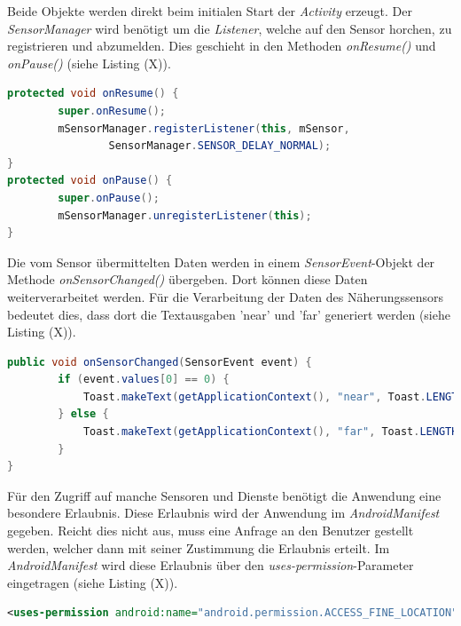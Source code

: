 Beide Objekte werden direkt beim initialen Start der \textit{Activity} erzeugt. Der \textit{SensorManager} wird benötigt um die \textit{Listener}, welche auf den Sensor horchen, zu registrieren und abzumelden. Dies geschieht in den Methoden \textit{onResume()} und \textit{onPause()} (siehe Listing (X)). 
\clearpage

\begin{lstlisting}[caption=Die Methoden \textit{onResume()} und \textit{onPause()}, label=lst:SensorInit, language=Java]
protected void onResume() {
        super.onResume();
        mSensorManager.registerListener(this, mSensor,
                SensorManager.SENSOR_DELAY_NORMAL);
}
protected void onPause() {
        super.onPause();
        mSensorManager.unregisterListener(this);
}
\end{lstlisting} 

Die vom Sensor übermittelten Daten werden in einem \textit{SensorEvent}-Objekt der Methode \textit{onSensorChanged()} übergeben. Dort können diese Daten weiterverarbeitet werden. Für die Verarbeitung der Daten des Näherungssensors bedeutet dies, dass dort die Textausgaben 'near' und 'far' generiert werden (siehe Listing (X)). 

\begin{lstlisting}[caption=Die Methode \textit{onSensorChanged()}, label=lst:SensorChanged, language=Java]
public void onSensorChanged(SensorEvent event) {
        if (event.values[0] == 0) {
            Toast.makeText(getApplicationContext(), "near", Toast.LENGTH_SHORT).show();
        } else {
            Toast.makeText(getApplicationContext(), "far", Toast.LENGTH_SHORT).show();
        }
}
\end{lstlisting} 

Für den Zugriff auf manche Sensoren und Dienste benötigt die Anwendung eine besondere Erlaubnis. Diese Erlaubnis wird der Anwendung im \textit{AndroidManifest} gegeben. Reicht dies nicht aus, muss eine Anfrage an den Benutzer gestellt werden, welcher dann mit seiner Zustimmung die Erlaubnis erteilt. Im \textit{AndroidManifest} wird diese Erlaubnis über den \textit{uses-permission}-Parameter eingetragen (siehe Listing (X)).

\begin{lstlisting}[caption=Erlaubnis für die Nutzung eines Dienstes im \textit{AndroidManifest}, label=lst:usesPermission, language=XML]
<uses-permission android:name="android.permission.ACCESS_FINE_LOCATION" />
\end{lstlisting}  

